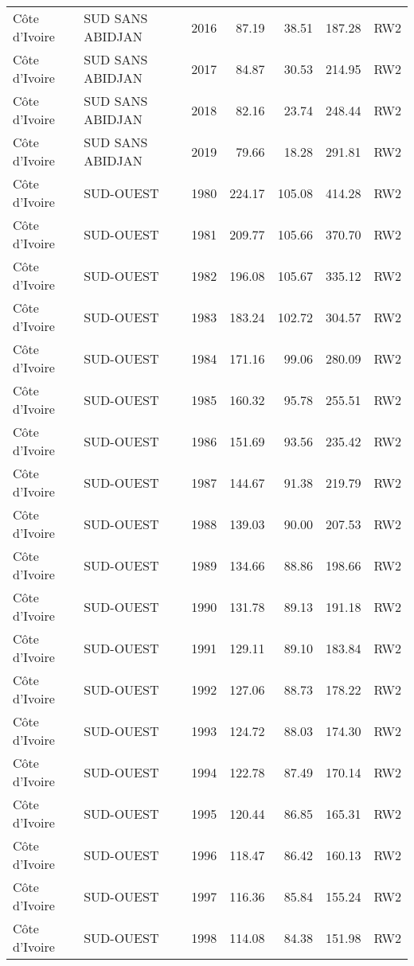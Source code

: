 \begin{longtable}{lllrrrl}
  C\^{o}te d'Ivoire & SUD SANS ABIDJAN & 2016 & 87.19 & 38.51 & 187.28 & RW2 \\ 
  C\^{o}te d'Ivoire & SUD SANS ABIDJAN & 2017 & 84.87 & 30.53 & 214.95 & RW2 \\ 
  C\^{o}te d'Ivoire & SUD SANS ABIDJAN & 2018 & 82.16 & 23.74 & 248.44 & RW2 \\ 
  C\^{o}te d'Ivoire & SUD SANS ABIDJAN & 2019 & 79.66 & 18.28 & 291.81 & RW2 \\ 
  C\^{o}te d'Ivoire & SUD-OUEST & 1980 & 224.17 & 105.08 & 414.28 & RW2 \\ 
  C\^{o}te d'Ivoire & SUD-OUEST & 1981 & 209.77 & 105.66 & 370.70 & RW2 \\ 
  C\^{o}te d'Ivoire & SUD-OUEST & 1982 & 196.08 & 105.67 & 335.12 & RW2 \\ 
  C\^{o}te d'Ivoire & SUD-OUEST & 1983 & 183.24 & 102.72 & 304.57 & RW2 \\ 
  C\^{o}te d'Ivoire & SUD-OUEST & 1984 & 171.16 & 99.06 & 280.09 & RW2 \\ 
  C\^{o}te d'Ivoire & SUD-OUEST & 1985 & 160.32 & 95.78 & 255.51 & RW2 \\ 
  C\^{o}te d'Ivoire & SUD-OUEST & 1986 & 151.69 & 93.56 & 235.42 & RW2 \\ 
  C\^{o}te d'Ivoire & SUD-OUEST & 1987 & 144.67 & 91.38 & 219.79 & RW2 \\ 
  C\^{o}te d'Ivoire & SUD-OUEST & 1988 & 139.03 & 90.00 & 207.53 & RW2 \\ 
  C\^{o}te d'Ivoire & SUD-OUEST & 1989 & 134.66 & 88.86 & 198.66 & RW2 \\ 
  C\^{o}te d'Ivoire & SUD-OUEST & 1990 & 131.78 & 89.13 & 191.18 & RW2 \\ 
  C\^{o}te d'Ivoire & SUD-OUEST & 1991 & 129.11 & 89.10 & 183.84 & RW2 \\ 
  C\^{o}te d'Ivoire & SUD-OUEST & 1992 & 127.06 & 88.73 & 178.22 & RW2 \\ 
  C\^{o}te d'Ivoire & SUD-OUEST & 1993 & 124.72 & 88.03 & 174.30 & RW2 \\ 
  C\^{o}te d'Ivoire & SUD-OUEST & 1994 & 122.78 & 87.49 & 170.14 & RW2 \\ 
  C\^{o}te d'Ivoire & SUD-OUEST & 1995 & 120.44 & 86.85 & 165.31 & RW2 \\ 
  C\^{o}te d'Ivoire & SUD-OUEST & 1996 & 118.47 & 86.42 & 160.13 & RW2 \\ 
  C\^{o}te d'Ivoire & SUD-OUEST & 1997 & 116.36 & 85.84 & 155.24 & RW2 \\ 
  C\^{o}te d'Ivoire & SUD-OUEST & 1998 & 114.08 & 84.38 & 151.98 & RW2 \\ 

\end{longtable}
